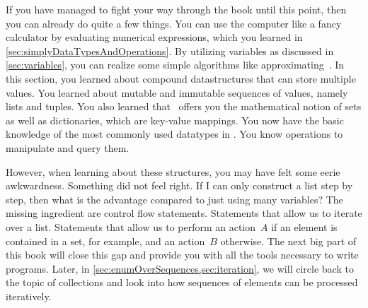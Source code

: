%
%
If you have managed to fight your way through the book until this point, then you can already do quite a few things.
You can use the computer like a fancy calculator by evaluating numerical expressions, which you learned in
\cref{sec:simplyDataTypesAndOperations}.
By utilizing variables as discussed in \cref{sec:variables}, you can realize some simple algorithms like approximating~\numberPi.
In this section, you learned about compound datastructures that can store multiple values.
You learned about mutable and immutable sequences of values, namely lists and tuples.
You also learned that \python\ offers you the mathematical notion of sets as well as dictionaries, which are key-value mappings.
You now have the basic knowledge of the most commonly used datatypes in \python.
You know operations to manipulate and query them.

However, when learning about these structures, you may have felt some eerie awkwardness.
Something did not feel right.
If I can only construct a list step by step, then what is the advantage compared to just using many variables?
The missing ingredient are control flow statements.
Statements that allow us to iterate over a list.
Statements that allow us to perform an action~$A$ if an element is contained in a set, for example, and an action~$B$ otherwise.
The next big part of this book will close this gap and provide you with all the tools necessary to write  programs.
Later, in \cref{sec:enumOverSequences,sec:iteration}, we will circle back to the topic of collections and look into how sequences of elements can be processed iteratively.%
%
\endhsection%
%
